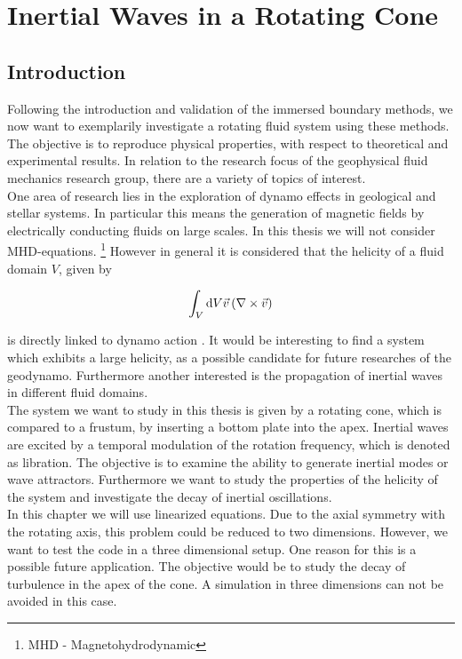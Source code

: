 \chapter{Inertial Waves in a Rotating Cone}

\section{Introduction}

Following the introduction and validation of the immersed boundary methods,
we now want to exemplarily investigate a rotating fluid system using these methods.
The objective is to reproduce  physical properties, with respect to theoretical and experimental results.
In relation to the research focus of the geophysical fluid mechanics research group, there are a variety
of topics of interest.\\
One area of research lies in the exploration of dynamo effects in geological and stellar systems.
In particular this means the generation of magnetic fields by electrically conducting fluids on large scales.
In this thesis we will not consider MHD-equations.  \footnote{MHD - Magnetohydrodynamic}
However in general it is considered that the helicity of a fluid domain $V$, given by

\begin{align}
    \int_{V}\mathop{}\!\mathrm{d} V  \vec{v} \left( \nabla \times \vec{v} \right)
\end{align}

is directly linked to dynamo action \citep{moffat1978}.
It would be interesting to find a system which exhibits a large helicity,
as a possible candidate for future researches of the geodynamo.
Furthermore another interested is the propagation of inertial waves in different fluid domains.\\
The system we want to study in this thesis is given by a rotating cone, which is compared to
a frustum, by inserting a bottom plate into the apex.
Inertial waves are excited by a temporal modulation of the rotation frequency, which is denoted as libration.
The objective is to examine the ability to generate inertial modes or wave attractors.
Furthermore we want to study the properties of the helicity of the system and investigate the
decay of inertial oscillations.\\
In this chapter we will use linearized equations. Due to the axial symmetry with the rotating axis,
this problem could be reduced to two dimensions.
However, we want to test the code in a three dimensional setup.
One reason for this is a possible future application.
The objective would be to study the decay of turbulence in the apex of the cone.
A simulation in three dimensions can not be avoided in this case.


